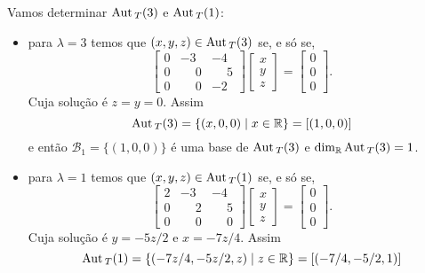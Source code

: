 \begin{exemplo}
\begin{enumerate}[label={\arabic*})]
\begin{solucao}
            Vamos determinar ${\rm Aut\,}_T(3)$ e ${\rm Aut\,}_T(1)$:
            \begin{itemize}
                \item para $\lambda = 3$ temos que $(x,y,z) \in {\rm Aut\,}_T(3)$ se, e s\'o se,
                \[
                    \begin{bmatrix}
                        0 & -3 & -4\\
                        0 & \phantom{-}0 & \phantom{-}5\\
                        0 & \phantom{-}0 & -2
                    \end{bmatrix}\begin{bmatrix}
                        x\\y\\z
                    \end{bmatrix} = \begin{bmatrix}
                        0\\0\\0
                    \end{bmatrix}.
                \]
                Cuja solu\c{c}ão é $z = y = 0$. Assim
                \[
                    {\rm Aut\,}_T(3) = \{(x,0,0) \mid x \in \mathbb{R}\} = [(1,0,0)]
                \]
                e ent\~ao $\mathcal{B}_1 = \{(1,0,0)\}$ \'e uma base de ${\rm Aut\,}_T(3)$ e $\dim_{\mathbb{R}}{\rm Aut\,}_T(3) = 1$.
                \item para $\lambda = 1$ temos que $(x,y,z) \in {\rm Aut\,}_T(1)$ se, e s\'o se,
                \[
                    \begin{bmatrix}
                        2 & -3 & -4\\
                        0 & \phantom{-}2 & \phantom{-}5\\
                        0 & \phantom{-}0 & \phantom{-}0
                    \end{bmatrix}\begin{bmatrix}
                        x\\y\\z
                    \end{bmatrix} = \begin{bmatrix}
                        0\\0\\0
                    \end{bmatrix}.
                \]
                Cuja solu\c{c}ão é $y = -5z/2$ e $x = -7z/4$. Assim
                \[
                    {\rm Aut\,}_T(1) = \{(-7z/4,-5z/2,z) \mid z \in \mathbb{R}\} = [(-7/4,-5/2,1)]
\]
\end{itemize}
\end{solucao}
\end{enumerate}
\end{exemplo}
